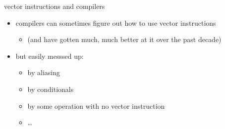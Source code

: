 

\begin{frame}[fragile,label=explicitVec]{vector instructions and compilers}
\begin{itemize}
    \item compilers can sometimes figure out how to use vector instructions
        \begin{itemize}
        \item (and have gotten much, much better at it over the past decade)
        \end{itemize}
    \item but easily messsed up:
    \begin{itemize}
        \item by aliasing
        \item by conditionals
        \item by some operation with no vector instruction
        \item \ldots
    \end{itemize}
\end{itemize}
\end{frame}

